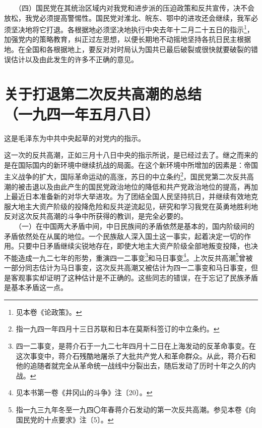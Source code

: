 \documentclass[cn,11pt,chinese]{elegantbook}
\def\myformat#1{\hfil\hfil #1}
\begin{document}
　　（四）国民党在其统治区域内对我党和进步派的压迫政策和反共宣传，决不会放松，我党必须提高警惕性。国民党对淮北、皖东、鄂中的进攻还会继续，我军必须坚决地将它打退。各根据地必须坚决地执行中央去年十二月二十五日的指示\footnote[7]{ 见本卷《论政策》。}，加强党内的策略教育，纠正过左思想，以便长期地不动摇地坚持各抗日民主根据地。在全国和各根据地上，要反对对时局认为国共已最后破裂或很快就要破裂的错误估计以及由此发生的许多不正确的意见。\\
\newpage\section*{\myformat{关于打退第二次反共高潮的总结}\\\myformat{（一九四一年五月八日）}}
\begin{introduction}\item  这是毛泽东为中共中央起草的对党内的指示。\end{introduction}
这一次的反共高潮，正如三月十八日中央的指示所说，是已经过去了。继之而来的是在国际国内的新环境中继续抗战的局面。在这个新环境中所增加的因素是：帝国主义战争的扩大，国际革命运动的高涨，苏日的中立条约\footnote[1]{ 指一九四一年四月十三日苏联和日本在莫斯科签订的中立条约。}，国民党第二次反共高潮的被击退以及由此产生的国民党政治地位的降低和共产党政治地位的提高，再加上最近日本准备新的对华大举进攻。为了团结全国人民坚持抗日，并继续有效地克服大地主大资产阶级的投降危险和反共逆流起见，研究和学习我党在英勇地胜利地反对这次反共高潮的斗争中所获得的教训，是完全必要的。\\
　　（一）在中国两大矛盾中间，中日民族间的矛盾依然是基本的，国内阶级间的矛盾依然处在从属的地位。一个民族敌人深入国土这一事实，起着决定一切的作用。只要中日矛盾继续尖锐地存在，即使大地主大资产阶级全部地叛变投降，也决不能造成一九二七年的形势，重演四一二事变\footnote[2]{ 四一二事变，是蒋介石于一九二七年四月十二日在上海发动的反革命事变。在这次事变中，蒋介石残酷地屠杀了大批共产党人和革命群众。从此，蒋介石和他的追随者就完全从革命统一战线中分裂出去，随后发动了历时十年之久的内战。}和马日事变\footnote[3]{ 见本书第一卷《井冈山的斗争》注〔20〕。}。上次反共高潮\footnote[4]{ 指一九三九年冬至一九四〇年春蒋介石发动的第一次反共高潮。参见本卷《向国民党的十点要求》注〔5〕。}曾被一部分同志估计为马日事变，这次反共高潮又被估计为四一二事变和马日事变，但是客观事实却证明了这种估计是不正确的。这些同志的错误，在于忘记了民族矛盾是基本矛盾这一点。\\
\end{document}
